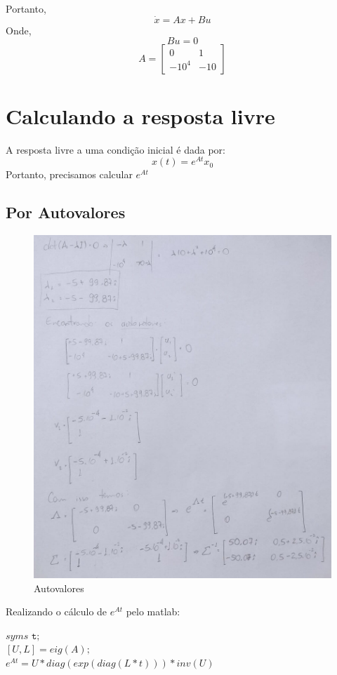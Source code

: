 \documentclass[a4paper, 12pt]{article}
\begin{document}
	\newpage
	Portanto,
	\begin{equation}
		\dot{x} = Ax + Bu
	\end{equation}
	Onde,
	\begin{equation}
		Bu = 0
	\end{equation}
	\begin{equation}
		A = \begin{bmatrix}
		0 & 1\\
		-10^4 & -10
		\end{bmatrix}
	\end{equation}

\section{Calculando a resposta livre}
	A resposta livre a uma condição inicial é dada por:
	\begin{equation}
		x(t) = e^{At} x_0
	\end{equation}
	Portanto, precisamos calcular $e^{At}$
	
	\subsection{Por Autovalores}
		\begin{figure}[h]
			\centering
			\includegraphics[scale=0.3]{imagens/a2.jpg}
			\caption{Autovalores}
		\end{figure}
		Realizando o cálculo de $e^{At}$ pelo matlab:
		\begin{center}
			$syms \texttt{ t};$\\
			$[U,L] = eig(A);$\\
			$e^{At} = U*diag(exp(diag(L*t)))*inv(U)$\\
		\end{center}				
		
\end{document}
